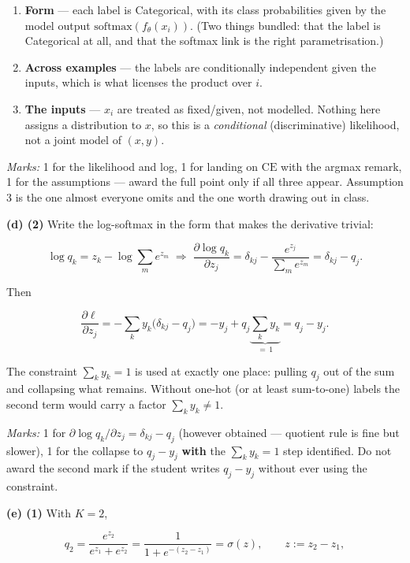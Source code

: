\documentclass[
  11pt,
  a4paper,
]{article}
\providecommand{\tightlist}{%
  \setlength{\itemsep}{0pt}\setlength{\parskip}{0pt}}
\newcommand{\sig}{\sigma}
\begin{document}
\begin{enumerate}
\def\labelenumi{\arabic{enumi}.}
\tightlist
\item
  \textbf{Form} --- each label is Categorical, with its class
  probabilities given by the model output
  \(\mathrm{softmax}(f_\theta(x_i))\). (Two things bundled: that the
  label is Categorical at all, and that the softmax link is the right
  parametrisation.)
\item
  \textbf{Across examples} --- the labels are conditionally independent
  given the inputs, which is what licenses the product over \(i\).
\item
  \textbf{The inputs} --- \(x_i\) are treated as fixed/given, not
  modelled. Nothing here assigns a distribution to \(x\), so this is a
  \emph{conditional} (discriminative) likelihood, not a joint model of
  \((x,y)\).
\end{enumerate}

\emph{Marks:} 1 for the likelihood and log, 1 for landing on
\(\mathrm{CE}\) with the argmax remark, 1 for the assumptions --- award
the full point only if all three appear. Assumption 3 is the one almost
everyone omits and the one worth drawing out in class.

\textbf{(d) (2)} Write the log-softmax in the form that makes the
derivative trivial:

\[
\log q_k = z_k - \log\!\sum_{m} e^{z_m}
\;\Longrightarrow\;
\frac{\partial \log q_k}{\partial z_j}
= \delta_{kj} - \frac{e^{z_j}}{\sum_m e^{z_m}}
= \delta_{kj} - q_j .
\]

Then

\[
\frac{\partial \ell}{\partial z_j}
= -\sum_{k} y_k\big(\delta_{kj} - q_j\big)
= -y_j + q_j \underbrace{\sum_k y_k}_{=\,1}
= q_j - y_j .
\]

The constraint \(\sum_k y_k = 1\) is used at exactly one place: pulling
\(q_j\) out of the sum and collapsing what remains. Without one-hot (or
at least sum-to-one) labels the second term would carry a factor
\(\sum_k y_k \ne 1\).

\emph{Marks:} 1 for \(\partial \log q_k/\partial z_j = \delta_{kj}-q_j\)
(however obtained --- quotient rule is fine but slower), 1 for the
collapse to \(q_j - y_j\) \textbf{with} the \(\sum_k y_k = 1\) step
identified. Do not award the second mark if the student writes
\(q_j - y_j\) without ever using the constraint.

\textbf{(e) (1)} With \(K=2\),

\[
q_2 = \frac{e^{z_2}}{e^{z_1}+e^{z_2}}
    = \frac{1}{1+e^{-(z_2-z_1)}} = \sig(z),
\qquad z := z_2 - z_1,
\]
\end{document}
